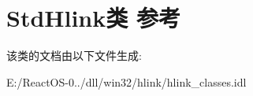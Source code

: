 \hypertarget{class_std_hlink}{}\section{Std\+Hlink类 参考}
\label{class_std_hlink}


该类的文档由以下文件生成\+:\begin{DoxyCompactItemize}
\item 
E\+:/\+React\+O\+S-\/0../dll/win32/hlink/hlink\+\_\+classes.\+idl\end{DoxyCompactItemize}
